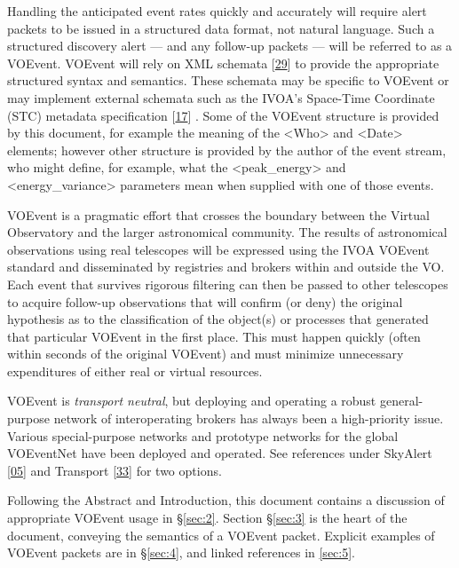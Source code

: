 \documentclass[11pt,a4paper]{ivoa}
\begin{document}
Handling the anticipated event rates quickly and accurately will require alert packets to be issued in a structured data format, not natural language. Such a structured discovery alert --- and any follow-up packets --- will be referred to as a VOEvent. VOEvent will rely on XML schemata [\hyperref[bib29]{29}] to provide the appropriate structured syntax and semantics. These schemata may be specific to VOEvent or may implement external schemata such as the IVOA's Space-Time Coordinate (STC) metadata specification [\hyperref[bib17]{17}]
. Some of the VOEvent structure is provided by this document, for example the meaning of the <Who> and <Date> elements; however other structure is provided by the author of the event stream, who might define, for example, what the <peak\_energy> and <energy\_variance> parameters mean when supplied with one of those events. 

VOEvent is a pragmatic effort that crosses the boundary between the Virtual Observatory and the larger astronomical community. The results of astronomical observations using real telescopes will be expressed using the IVOA VOEvent standard and disseminated by registries and brokers within and outside the VO. Each event that survives rigorous filtering can then be passed to other telescopes to acquire follow-up observations that will confirm (or deny) the original hypothesis as to the classification of the object(s) or processes that generated that particular VOEvent in the first place. This must happen quickly (often within seconds of the original VOEvent) and must minimize unnecessary expenditures of either real or virtual resources. 

VOEvent is \emph{transport neutral}, but deploying and operating a robust general-purpose network of interoperating brokers has always been a high-priority issue. Various special-purpose networks and prototype networks for the global VOEventNet have been deployed and operated. See references under SkyAlert [\hyperref[bib05]{05}] and Transport [\hyperref[bib33]{33}] for two options. 

Following the Abstract and Introduction, this document contains a discussion of appropriate VOEvent usage in \S\ref{sec:2}. Section \S\ref{sec:3} is the heart of the document, conveying the semantics of a VOEvent packet. Explicit examples of VOEvent packets are in \S\ref{sec:4}, and linked references in \ref{sec:5}. 

\end{document}
